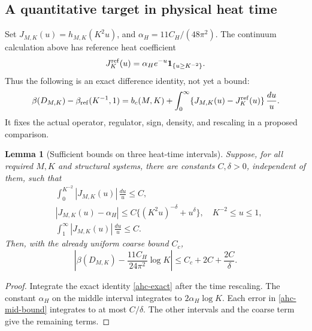 \documentclass[11pt]{article}
\newtheorem{lemma}[theorem]{Lemma}
\theoremstyle{remark}
\begin{document}
\subsection{A quantitative target in physical heat time}
\label{ahc-target-section}

Set \(J_{M,K}(u)=h_{M,K}(K^2u)\), and
\(\alpha_H=11C_H/(48\pi^2)\).
The continuum calculation above has reference heat
coefficient
\[
 J_K^{\rm ref}(u)=\alpha_H e^{-u}
                         {\bf1}_{\{u\ge K^{-2}\}}.
\]
Thus the following is an exact difference identity,
not yet a bound:
\begin{equation}
 \beta(D_{M,K})-\beta_{\rm ref}(K^{-1},1)
 =b_c(M,K)+\int_0^\infty
          \{J_{M,K}(u)-J_K^{\rm ref}(u)\}\,\frac{du}{u}.
 \label{ahc-difference}
\end{equation}
It fixes the actual operator, regulator, sign, density,
and rescaling in a proposed comparison.

\begin{lemma}[Sufficient bounds on three heat-time intervals]
\label{ahc-band-lemma}
Suppose, for all required \(M,K\) and structural systems,
there are constants \(C,\delta>0\), independent of them,
such that
\begin{align}
 &\int_0^{K^{-2}}|J_{M,K}(u)|\,\frac{du}{u}\le C,
                                      \label{ahc-uv-bound}\\
 &|J_{M,K}(u)-\alpha_H|
       \le C\{(K^2u)^{-\delta}+u^\delta\},
          \quad K^{-2}\le u\le1,       \label{ahc-mid-bound}\\
 &\int_1^\infty|J_{M,K}(u)|\,\frac{du}{u}\le C.
                                      \label{ahc-ir-bound}
\end{align}
Then, with the already uniform coarse bound \(C_c\),
\begin{equation}
 \left|\beta(D_{M,K})
       -\frac{11C_H}{24\pi^2}\log K\right|
           \le C_c+2C+\frac{2C}{\delta}.
 \label{ahc-log-conclusion}
\end{equation}
\end{lemma}

\begin{proof}
Integrate the exact identity \eqref{ahc-exact} after
the time rescaling. The constant \(\alpha_H\) on the
middle interval integrates to \(2\alpha_H\log K\).
Each error in \eqref{ahc-mid-bound} integrates to
at most \(C/\delta\). The other intervals and the
coarse term give the remaining terms.
\end{proof}
\end{document}
